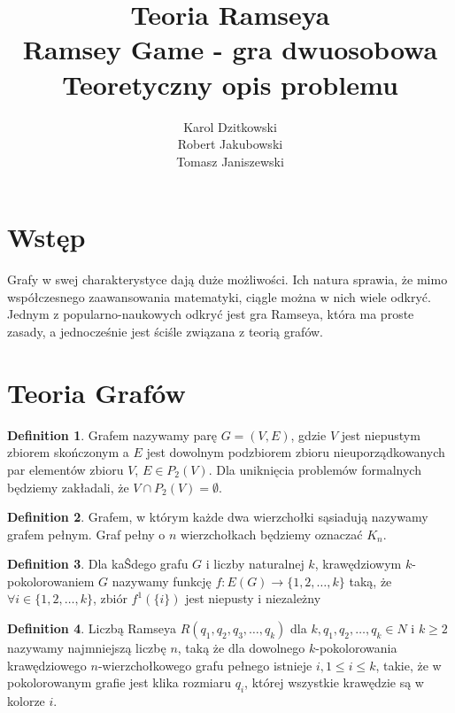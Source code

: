\documentclass[11pt,a4paper]{article}
\author{
	Karol Dzitkowski\\
	Robert Jakubowski\\
	Tomasz Janiszewski
}
\title{
	Teoria Ramseya\\
	\huge{Ramsey Game - gra dwuosobowa}\\
	Teoretyczny opis problemu
 }
\theoremstyle{definition}
\newtheorem{definition}{Definition}[section]
\theoremstyle{remark}
\begin{document}
\maketitle
\newpage

\tableofcontents
\newpage

\section{Wstęp}
Grafy w swej charakterystyce dają duże możliwości.
 Ich natura sprawia, że mimo współczesnego zaawansowania matematyki,
 ciągle można w nich wiele odkryć. Jednym z popularno-naukowych odkryć jest gra Ramseya,
 która ma proste zasady, a jednocześnie jest ściśle związana z teorią grafów.

\section{Teoria Grafów}
\begin{definition}
Grafem nazywamy parę $G=(V,E)$, gdzie $V$ jest niepustym zbiorem skończonym a $E$ jest dowolnym
podzbiorem zbioru nieuporządkowanych par elementów zbioru $V$, $E \in P_2(V)$.
Dla uniknięcia
problemów formalnych będziemy zakładali, że $V∩P_2(V)=\emptyset$.
\end{definition}

\begin{definition}
Grafem, w którym każde dwa wierzchołki sąsiadują nazywamy grafem pełnym.
Graf pełny o $n$ wierzchołkach będziemy oznaczać $K_n$.
\end{definition}

\begin{definition}
Dla kaŜdego grafu $G$ i liczby naturalnej $k$, krawędziowym $k$-pokolorowaniem $G$ nazywamy
funkcję $f:E(G)\rightarrow\{1,2, \dots ,k\}$ taką, że
$\forall i \in \{1,2, \dots ,k\}$, zbiór $f^1(\{i\})$ jest niepusty i
niezależny
\end{definition}

\begin{definition}
Liczbą Ramseya  $R (q_1, q_2, q_3, \ldots, q_k )$  dla
$k, q_1, q_2, \ldots, q_k \in N$ i
$k \ge 2$
nazywamy najmniejszą liczbę $n$,
taką że dla dowolnego $k$-pokolorowania krawędziowego $n$-wierzchołkowego grafu pełnego istnieje
$i, 1 \le i \le k$, takie, że w pokolorowanym grafie jest klika rozmiaru $q_i$,
której wszystkie krawędzie są w kolorze $i$.
\end{definition}
\end{document}
